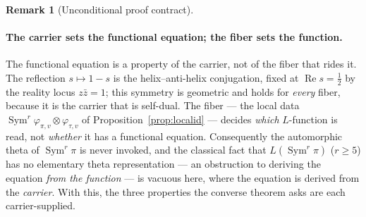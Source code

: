 \documentclass[11pt]{article}
\theoremstyle{definition}
\newtheorem{remark}[theorem]{Remark}
\renewcommand{\Re}{\operatorname{Re}}
\newcommand{\Sym}{\operatorname{Sym}}
\begin{document}
\begin{remark}[Unconditional proof contract]
\begin{enumerate}
\paragraph{The carrier sets the functional equation; the fiber sets the function.} The functional
equation is a property of the carrier, not of the fiber that rides it. The reflection $s\mapsto1-s$ is
the helix--anti-helix conjugation, fixed at $\Re s=\tfrac12$ by the reality locus $z\bar z=1$; this
symmetry is geometric and holds for \emph{every} fiber, because it is the carrier that is self-dual. The
fiber --- the local data $\Sym^r\varphi_{\pi,v}\otimes\varphi_{\tau,v}$ of
Proposition~\ref{prop:localid} --- decides \emph{which} $L$-function is read, not \emph{whether} it has a
functional equation. Consequently the automorphic theta of $\Sym^r\pi$ is never invoked, and the
classical fact that $L(\Sym^r\pi)$ ($r\ge5$) has no elementary theta representation --- an obstruction to
deriving the equation \emph{from the function} --- is vacuous here, where the equation is derived from
the \emph{carrier}. With this, the three properties the converse theorem asks are each carrier-supplied.


\end{enumerate}
\end{remark}
\end{document}
